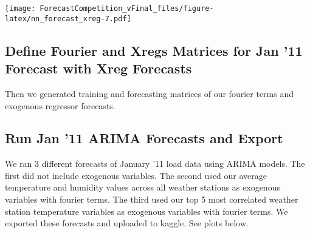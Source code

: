 \documentclass[
]{article}
\newenvironment{Shaded}{\begin{snugshade}}{\end{snugshade}}
\newcommand{\FunctionTok}[1]{\textcolor[rgb]{0.00,0.00,0.00}{#1}}
\newcommand{\NormalTok}[1]{#1}
\newcommand{\OtherTok}[1]{\textcolor[rgb]{0.56,0.35,0.01}{#1}}
\newcommand{\SpecialCharTok}[1]{\textcolor[rgb]{0.00,0.00,0.00}{#1}}
\begin{document}
\texttt{[image: ForecastCompetition\_vFinal\_files/figure-latex/nn\_forecast\_xreg-7.pdf]}

\hypertarget{define-fourier-and-xregs-matrices-for-jan-11-forecast-with-xreg-forecasts}{%
\subsection{Define Fourier and Xregs Matrices for Jan '11 Forecast with
Xreg
Forecasts}\label{define-fourier-and-xregs-matrices-for-jan-11-forecast-with-xreg-forecasts}}

Then we generated training and forecasting matrices of our fourier terms
and exogenous regressor forecasts.

\begin{Shaded}
\end{Shaded}

\hypertarget{run-jan-11-arima-forecasts-and-export}{%
\subsection{Run Jan '11 ARIMA Forecasts and
Export}\label{run-jan-11-arima-forecasts-and-export}}

We ran 3 different forecasts of January '11 load data using ARIMA
models. The first did not include exogenous variables. The second used
our average temperature and humidity values across all weather stations
as exogenous variables with fourier terms. The third used our top 5 most
correlated weather station temperature variables as exogenous variables
with fourier terms. We exported these forecasts and uploaded to kaggle.
See plots below.
\end{document}
